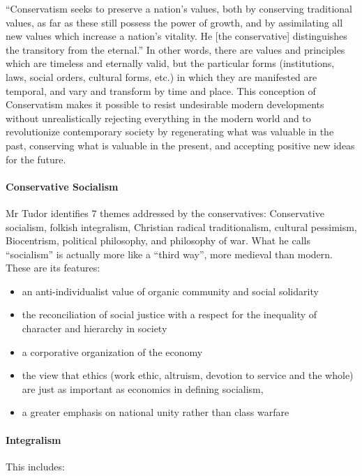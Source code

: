 \begin{quotex}
“Conservatism seeks to preserve a nation's values, both by conserving traditional values, as far as these
still possess the power of growth, and by assimilating all new values which increase a nation's vitality.
He [the conservative] distinguishes the transitory from the eternal.” In other words, there are values and principles
which are timeless and eternally valid, but the particular forms (institutions, laws, social orders, cultural forms,
etc.) in which they are manifested are temporal, and vary and transform by time and place. This conception of
Conservatism makes it possible to resist undesirable modern developments without unrealistically rejecting everything
in the modern world and to revolutionize contemporary society by regenerating what was valuable in the past, conserving
what is valuable in the present, and accepting positive new ideas for the future. 

\end{quotex}
\paragraph{Conservative Socialism}
Mr Tudor identifies 7 themes addressed by the conservatives: Conservative socialism, folkish integralism, Christian
radical traditionalism, cultural pessimism, Biocentrism, political philosophy, and philosophy of war. What he calls
“socialism” is actually more like a “third way”, more medieval than modern. These are its features:

\begin{itemize}
\item an anti-individualist value of organic community and social solidarity 
\item the reconciliation of social justice with a respect for the inequality of character and hierarchy in society 
\item a corporative organization of the economy 
\item the view that ethics (work ethic, altruism, devotion to service and the whole) are just as important as economics
in defining socialism, 
\item a greater emphasis on national unity rather than class warfare 
\end{itemize}

\paragraph{Integralism}
This includes:

